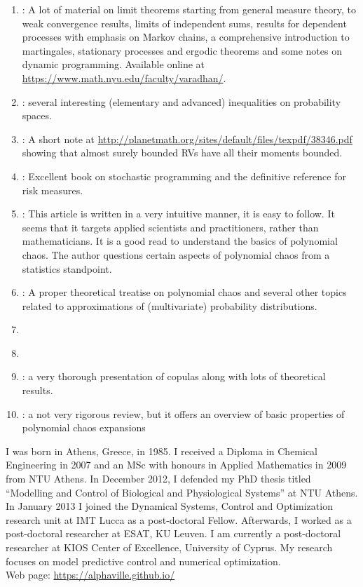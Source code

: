 \documentclass[a4paper,10pt]{scrbook}
\let\oldbibentry\bibentry
\renewcommand{\bibentry}[1]{{\color{blue} \oldbibentry{#1}}}
\begin{document}
{\begin{enumerate}
 \item \label{cite:Varadhan} : A lot of material on limit theorems 
       starting from general measure theory, to weak convergence results, limits 
       of independent sums, results for dependent processes 
       with emphasis on Markov chains, a comprehensive introduction to martingales, stationary processes
       and ergodic theorems and some notes on dynamic programming. 
       Available online at \url{https://www.math.nyu.edu/faculty/varadhan/}.
 \item \label{cite:LinBai2011} : several interesting (elementary 
       and advanced) inequalities on probability spaces.  
 \item \label{cite:Ambrosio2013} : A short note at
       \url{http://planetmath.org/sites/default/files/texpdf/38346.pdf}
       showing that almost surely bounded RVs have all their moments bounded.
 \item \label{cite:SDR2014} : Excellent book on stochastic programming and 
       the definitive reference for risk measures.
 \item \label{cite:AOHaganPolyChaos13} : This article is written 
       in a very intuitive manner, it is easy to follow. It seems that it targets applied scientists
       and practitioners, rather than mathematicians. It is a good read to understand the basics of 
       polynomial chaos. The author questions certain aspects of polynomial chaos from 
       a statistics standpoint.
 \item \label{cite:DXiu10} : A proper theoretical treatise on polynomial chaos
       and several other topics related to approximations of (multivariate) probability distributions.
 \item \label{cite:Eldred2009}   
 \item \label{cite:CopingWithCopulas} 
 \item \label{cite:copulasSlides} : a very thorough presentation of 
       copulas along with lots of theoretical results. 
 \item \label{cite:KaiDhaSpi18} : a not very rigorous review, but it offers
       an overview of basic properties of polynomial chaos expansions
\end{enumerate}
}

I was born in Athens, Greece, in 1985. I received a Diploma in Chemical Engineering in 2007 and an 
MSc with honours in Applied Mathematics in 2009 from NTU Athens. In December 2012, I defended my 
PhD thesis titled ``Modelling and Control of Biological and Physiological Systems'' at NTU Athens. 
In January 2013 I joined the Dynamical Systems, Control and Optimization research unit at IMT 
Lucca as a post-doctoral Fellow. Afterwards, I worked as a post-doctoral researcher at ESAT, KU Leuven. 
I am currently a post-doctoral researcher at KIOS Center of Excellence, University of Cyprus. 
My research focuses on model predictive control and numerical optimization.\\[1.2em]

\noindent Web page: \url{https://alphaville.github.io/}

\end{document}
